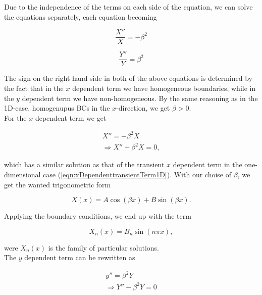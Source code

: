 \documentclass{article}
\begin{document}
Due to the independence of the terms on each side of the equation, we can solve the equations separately, each equation becoming

\begin{equation}
\frac{X''}{X} = -\beta^2 \nonumber
\end{equation}

\begin{equation}
\frac{Y''}{Y} = \beta^2 \nonumber
\end{equation}

The sign on the right hand side in both of the above equations is determined by the fact that in the $x$ dependent term we have homogeneous boundaries, while in the $y$ dependent term we have non-homogeneous. By the same reasoning as in the 1D-case, homogenupus BCs in the $x$-direction, we get $\beta > 0$. \\

For the $x$ dependent term we get

\begin{eqnarray}
\nonumber
X'' = -\beta^2 X \\ \nonumber
\Rightarrow X'' + \beta^2 X = 0,
\end{eqnarray}

which has a similar solution as that of the transient $x$ dependent term in the one-dimensional case (\ref{eqn:xDependenttransientTerm1D}). With our choise of $\beta$, we get the wanted trigonometric form

\begin{equation}
X(x) = A\cos(\beta x) + B\sin(\beta x) \nonumber.
\end{equation}

Applying the boundary conditions, we end up with the term

\begin{equation}
X_n(x) = B_n\sin(n\pi x),
\label{eqn:xDependenSteadyState2D}
\end{equation}

were ${X_n(x)}$ is the family of particular solutions.\\

The $y$ dependent term can be rewritten as 

\begin{subequations}
	\begin{eqnarray}
	y'' = \beta^2 Y \\ 
	\Rightarrow Y'' - \beta^2 Y = 0 
	\end{eqnarray}
\end{subequations}
\end{document}
